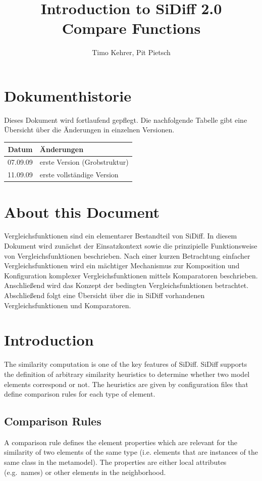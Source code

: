 \documentclass[10pt,a4paper]{scrartcl}
\title{Introduction to SiDiff 2.0\\Compare Functions}
\author{Timo Kehrer, Pit Pietsch}
\begin{document}
\maketitle
\tableofcontents
\newpage
\section*{Dokumenthistorie}
Dieses Dokument wird fortlaufend gepflegt. Die nachfolgende Tabelle gibt 
eine Übersicht über die Änderungen in einzelnen Versionen.\\


\noindent
\begin{tabular}{|c|p{11cm}|}\hline
Datum & Änderungen \\\hline\hline
07.09.09 & erste Version (Grobstruktur) \\\hline
11.09.09 & erste vollständige Version \\\hline
\end{tabular} 


\newpage


\section{About this Document}
Vergleichsfunktionen sind ein elementarer Bestandteil von SiDiff. In diesem Dokument wird zunächst
der Einsatzkontext sowie die prinzipielle Funktionsweise von Vergleichsfunktionen beschrieben.
Nach einer kurzen Betrachtung einfacher Vergleichsfunktionen wird ein mächtiger Mechanismus
zur Komposition und Konfiguration komplexer Vergleichsfunktionen mittels Komparatoren beschrieben. 
Anschließend wird das Konzept der bedingten Vergleichsfunktionen betrachtet.
Abschließend folgt eine Übersicht über die in SiDiff vorhandenen Vergleichsfunktionen und Komparatoren.



\section{Introduction}
\label{introduction}
The similarity computation is one of the key features of SiDiff. SiDiff supports the definition of
arbitrary similarity heuristics to determine whether two model elements correspond or not. 
The heuristics are given by configuration files that define comparison rules for each type of
element.

\subsection{Comparison Rules}
\label{comparison-rules}
A comparison rule defines the element properties which are relevant for the similarity of two
elements of the same type (i.e. elements that are instances of the same class in the metamodel). 
The properties are either local attributes (e.g.~names) or other elements in the neighborhood.
\end{document}
